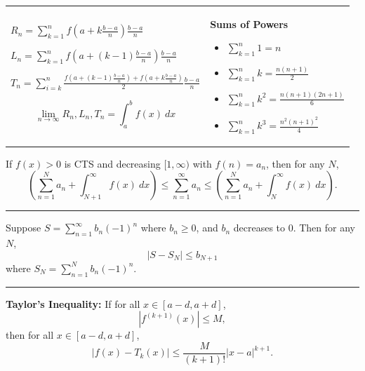 \documentclass{article}
\newenvironment{bx}[1][]{
\begin{tcolorbox}[colback=white!97!black, title=#1, arc=0in, halign=flush left, left=1mm, right=1mm,]
}{
\end{tcolorbox}
}
\begin{document}
\begin{multicols}{2}

\begin{bx}[Riemann Sums]
\begin{tabular}{p{155pt} | p{100pt}}
    $ R_n=\sum_{k=1}^{n}f\left(a+k\frac{b-a}{n}\right)\frac{b-a}{n}$ 

$ L_n=\sum_{k=1}^{n}f\left(a+(k-1)\frac{b-a}{n}\right)\frac{b-a}{n}$ 

$ T_n=\sum_{i=k}^{n}\frac{f\left(a+(k-1)\frac{b-a}{n}\right)+f\left(a+k\frac{b-a}{n}\right)}{2}\frac{b-a}{n}$

\vspace{-1em}

$$\lim_{n\to\infty}R_n,L_n,T_n=\int_a^bf(x)\ dx$$

& 
\textbf{Sums of Powers}

\begin{itemize}[leftmargin=0.75em]
    \item $\sum_{k=1}^n 1 = n $
    \item $\sum_{k=1}^n k = \frac{n(n+1)}{2}$
    \item $\sum_{k=1}^n k^2 = \frac{n(n+1)(2n+1)}{6}$
    \item $\sum_{k=1}^n k^3 = \frac{n^2(n+1)^2}{4}$
\end{itemize}
\end{tabular}

\end{bx}


\begin{bx}[Bounds]

If $f(x)>0$ is CTS and decreasing $[1,\infty)$ with $f(n)=a_n$, then for any $N$,
$$\left(\sum_{n=1}^N a_n+\int_{N+1}^\infty f(x)\ dx \right)
\leq \sum_{n=1}^\infty a_n \leq 
\left(\sum_{n=1}^N a_n+  \int_{N}^\infty f(x)\ dx\right).$$

\hrule
\vspace{1em}

Suppose $S=\sum_{n=1}^\infty b_n (-1)^n$ where $b_n\geq 0$, and $b_n$ decreases to 0. Then for any $N$,
$$\left|S-S_N\right|\leq b_{N+1}$$
where $S_N=\sum_{n=1}^N b_n (-1)^n$.
\vspace{1em}

\hrule
\vspace{1em}

\textbf{Taylor's Inequality:}
If for all $x\in [a-d,a+d]$,
$$\left|f^{(k+1)}(x)\right|\leq M,$$
then for all $x\in [a-d,a+d]$,
$$|f(x)-T_k(x)|\leq \frac{M}{(k+1)!}|x-a|^{k+1}.$$





\end{bx}
\end{multicols}
\end{document}
